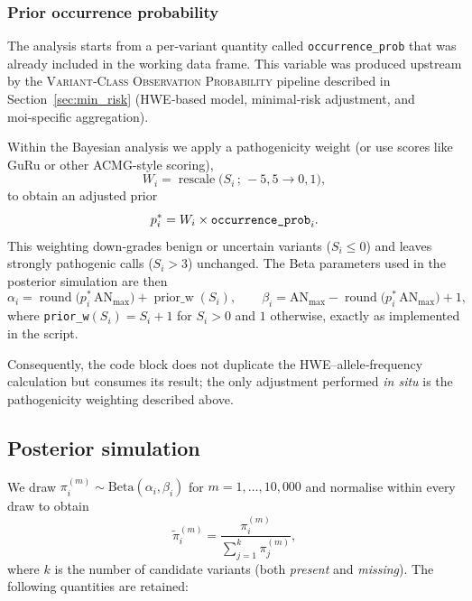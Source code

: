 
\subsubsection{Prior occurrence probability}

The analysis starts from a per‑variant quantity called
\verb|occurrence_prob| that was already included in the working
data frame.  This variable was produced upstream by the
\textsc{Variant‑Class Observation Probability} pipeline described in
Section~\ref{sec:min_risk} (HWE‑based model, minimal‐risk adjustment,
and \ac{moi}‑specific aggregation).%

Within the Bayesian analysis we apply
a pathogenicity weight (or use scores like GuRu or other ACMG-style scoring),
\[
W_i=\operatorname{rescale}\!\bigl(S_i\,;\,-5,5\rightarrow 0,1\bigr),
\]
to obtain an adjusted prior
\[
p_i^{\ast}=W_i \times \verb|occurrence_prob|_i .
\]
This weighting down‑grades benign or uncertain variants
($S_i\le 0$) and leaves strongly pathogenic calls ($S_i>3$) unchanged.
The Beta parameters used in the posterior simulation are then
\[
\alpha_i=\operatorname{round}\!\bigl(p_i^{\ast}\,\text{AN}_{\max}\bigr)+
          \operatorname{prior\_w}(S_i),
\qquad
\beta_i = \text{AN}_{\max}-\operatorname{round}\!\bigl(p_i^{\ast}\,
          \text{AN}_{\max}\bigr)+1,
\]
where \verb|prior_w|$(S_i)=S_i+1$ for $S_i>0$ and $1$ otherwise, exactly
as implemented in the script.

Consequently, the code block does not duplicate the
HWE–allele‑frequency calculation but consumes its result; the only
adjustment performed \emph{in situ} is the pathogenicity weighting
described above.

\subsection{Posterior simulation}

We draw
$\pi_{i}^{(m)}\sim\mathrm{Beta}(\alpha_i,\beta_i)$ for
$m=1,\dots,10{,}000$ and normalise within every draw to obtain
\[
\tilde{\pi}_{i}^{(m)} = 
\frac{\pi_{i}^{(m)}}{\sum_{j=1}^{k}\pi_{j}^{(m)}},
\]
where $k$ is the number of candidate variants (both \emph{present} and
\emph{missing}).  The following quantities are retained:

